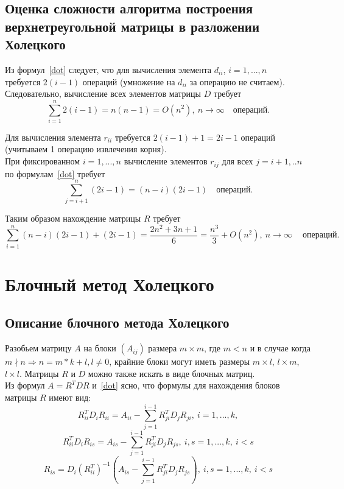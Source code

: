 \documentclass[a4paper,12pt]{article}
\begin{document}
\newpage
\subsection{Оценка сложности алгоритма построения верхнетреугольной матрицы
в разложении Холецкого}

    Из формул~\eqref{dot} следует, что для вычисления элемента $d_{ii}$, $i=1,...,n$\\
    требуется $2 (i-1)$ операций (умножение на $d_{ii}$ за операцию не считаем). \\
    Следовательно, вычисление всех элементов матрицы $D$ требует \\
    $$
        \sum_{i=1}^n 2(i-1) = n(n-1) = O(n^2), \
        n \rightarrow \infty 
        \quad \text{операций.}
    $$
    
    Для вычисления элемента $r_{ii}$ требуется $2 (i-1) + 1 = 2i - 1$ операций 
    (учитываем 1 операцию извлечения корня). \\
    При фиксированном $i=1,...,n$ вычисление элементов $r_{ij}$ для всех 
    $j=i+1,..n$ по формулам~\eqref{dot} требует 
    $$\sum_{j=i+1}^n(2i - 1) = (n-i)(2i - 1) \quad \text{операций.}$$ 

    Таким образом нахождение матрицы $R$ требует 
    $$
        \sum_{i=1}^n(n-i)(2i - 1)+(2i - 1) = 
        \frac{2n^2 + 3n + 1}6  =  \frac{n^3}3 + O(n^2), \
        n \rightarrow \infty \
        \quad \text{операций.}
    $$



\newpage
\section{Блочный метод Холецкого}
\subsection{Описание блочного метода Холецкого}
    Разобьем матрицу $A$ на блоки $(A_{ij})$ размера $m \times m$, где $m < n$ и 
    в случае когда $m \nmid n \Rightarrow n = m*k + l, l \neq 0$, 
    крайние блоки могут иметь размеры $m \times l$, $l \times m$, $l \times l$. 
    Матрицы $R$ и $D$ можно также искать в виде блочных матриц. \\
    
    Из формул $A = R^TDR$ и~\eqref{dot} ясно, что формулы для нахождения блоков 
    матрицы $R$ имеют вид:
    \begin{equation} \label{block_i}
        R_{ii}^T D_i R_{ii}  = A_{ii} - 
        \sum_{j=1}^{i-1} R_{ji}^T D_j R_{ji},\  
        i=1,...,k,
     \end{equation}
    $$
        R_{ii}^T D_i R_{is}  = A_{is} - 
        \sum_{j=1}^{i-1} R_{ji}^T D_j R_{js},\  
        i, s = 1,...,k, \ i < s
    $$
    \begin{equation} \label{block_is}
        R_{is} = D_i(R_{ii}^T)^{-1}(A_{is} - 
        \sum_{j=1}^{i-1} R_{ji}^T D_j R_{js}),\  
        i, s = 1,...,k, \ i < s
    \end{equation}
    
\end{document}
